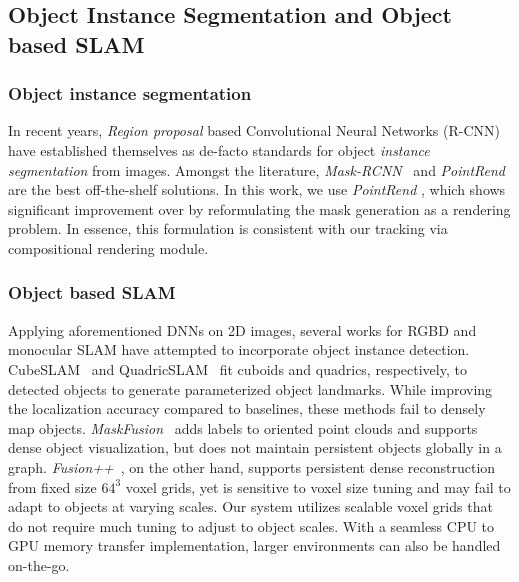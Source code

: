 \subsection{Object Instance Segmentation and Object based SLAM}
\subsubsection{Object instance segmentation}
In recent years, \textit{Region proposal} based Convolutional Neural Networks (R-CNN) \cite{renFasterRCNNRealTime2016} have established themselves as de-facto standards for object \textit{instance segmentation} from images. Amongst the literature, \textit{Mask-RCNN}~\cite{heMaskRCNN2018} and \textit{PointRend}~\cite{kirillovPointRendImageSegmentation2020} are the best off-the-shelf solutions.
In this work, we use \textit{PointRend} \cite{kirillovPointRendImageSegmentation2020}, which shows significant improvement over \cite{heMaskRCNN2018} by reformulating the mask generation as a rendering problem. In essence, this formulation is consistent with our tracking via compositional rendering module.

\subsubsection{Object based SLAM}
Applying aforementioned DNNs on 2D images, several works for RGBD and monocular SLAM have attempted to incorporate object instance detection. CubeSLAM~\cite{yangMonocularObjectPlane2019} and QuadricSLAM~\cite{nicholsonQuadricSLAMDualQuadrics2019} fit cuboids and quadrics, respectively, to detected objects to generate parameterized object landmarks. While improving the localization accuracy compared to baselines, these methods fail to densely map objects. \textit{MaskFusion}~\cite{runzMaskFusionRealTimeRecognition2018} adds labels to oriented point clouds and supports dense object visualization, but does not maintain persistent objects globally in a graph. \textit{Fusion++}~\cite{mccormacFusionVolumetricObjectLevel2018}, on the other hand, supports persistent dense reconstruction from fixed size $64^3$ voxel grids, yet is sensitive to voxel size tuning and may fail to adapt to objects at varying scales.
Our system utilizes scalable voxel grids that do not require much tuning to adjust to object scales. With a seamless CPU to GPU memory transfer implementation, larger environments can also be handled on-the-go.



